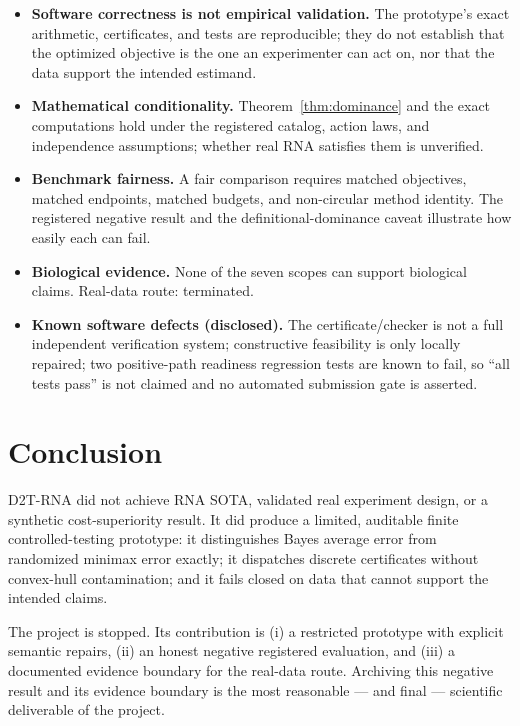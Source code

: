 \documentclass[11pt]{article}
\begin{document}
\begin{itemize}
  \item \textbf{Software correctness is not empirical validation.} The prototype's exact arithmetic, certificates, and tests are reproducible; they do not establish that the optimized objective is the one an experimenter can act on, nor that the data support the intended estimand.
  \item \textbf{Mathematical conditionality.} Theorem~\ref{thm:dominance} and the exact computations hold under the registered catalog, action laws, and independence assumptions; whether real RNA satisfies them is unverified.
  \item \textbf{Benchmark fairness.} A fair comparison requires matched objectives, matched endpoints, matched budgets, and non-circular method identity. The registered negative result and the definitional-dominance caveat illustrate how easily each can fail.
  \item \textbf{Biological evidence.} None of the seven scopes can support biological claims. Real-data route: terminated.
  \item \textbf{Known software defects (disclosed).} The certificate/checker is not a full independent verification system; constructive feasibility is only locally repaired; two positive-path readiness regression tests are known to fail, so ``all tests pass'' is not claimed and no automated submission gate is asserted.
\end{itemize}

\section{Conclusion}\label{sec:conclusion}

D2T-RNA did not achieve RNA SOTA, validated real experiment design, or a synthetic cost-superiority result. It did produce a limited, auditable finite controlled-testing prototype: it distinguishes Bayes average error from randomized minimax error exactly; it dispatches discrete certificates without convex-hull contamination; and it fails closed on data that cannot support the intended claims.

The project is stopped. Its contribution is (i) a restricted prototype with explicit semantic repairs, (ii) an honest negative registered evaluation, and (iii) a documented evidence boundary for the real-data route. Archiving this negative result and its evidence boundary is the most reasonable --- and final --- scientific deliverable of the project.
\end{document}
